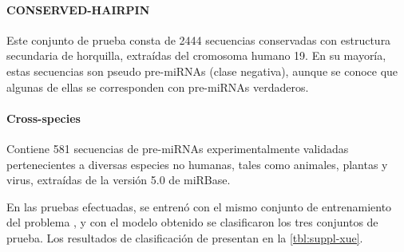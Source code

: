\paragraph{CONSERVED-HAIRPIN}
Este conjunto de prueba consta de 2444 secuencias conservadas con
estructura secundaria de horquilla, extraídas del cromosoma humano
19. En su mayoría, estas secuencias son pseudo pre-miRNAs (clase
negativa), aunque se conoce que algunas de ellas se corresponden con
pre-miRNAs verdaderos.
\paragraph{Cross-species}
Contiene 581 secuencias de pre-miRNAs experimentalmente validadas
pertenecientes a diversas especies no humanas, tales como animales,
plantas y virus, extraídas de la versión 5.0 de miRBase.

En las pruebas efectuadas, se entrenó con el mismo conjunto de
entrenamiento del problema \tripletsvm{}, y con el modelo obtenido se
clasificaron los tres conjuntos de prueba. Los resultados de
clasificación de presentan en la \autoref{tbl:suppl-xue}.